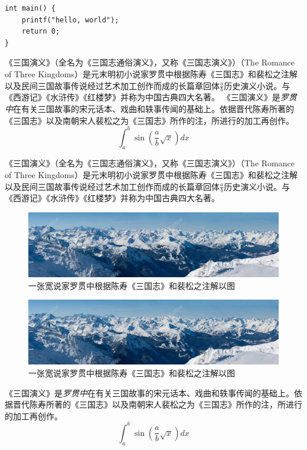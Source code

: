 \begin{verbatim}
int main() {
    printf("hello, world");
    return 0;
}
\end{verbatim}

《三国演义》（全名为《三国志通俗演义》，又称《三国志演义》）（The Romance of Three Kingdoms）是元末明初小说家罗贯中根据陈寿\cite{ausubel1991}《三国志》和裴松之注解以及民间三国故事传说经过艺术加工创作而成的长篇章回体$\frac{a}{b}$历史演义小说。与《西游记》《水浒传》《红楼梦》并称为中国古典四大名著。
《三国演义》是\emph{罗贯中}在有关{\sffamily 三国故事的宋元话本}、戏曲和轶事传闻的基础上。依据晋代陈寿所著的《三国志》以及南朝宋人裴松之为《三国志》所作的注，所进行的加工再创作。
\begin{equation}
    \int_a^b\sin(\frac{a}{b}\sqrt{x})dx
\end{equation}

《三国演义》（全名为《三国志通俗演义》，又称《三国志演义》）（The Romance of Three Kingdoms）是元末明初小说家罗贯中根据陈寿《三国志》和裴松之注解以及民间三国故事传说经过艺术加工创作而成的长篇章回体$\frac{a}{b}$历史演义小说。与《西游记》《水浒传》《红楼梦》并称为中国古典四大名著。
\begin{figure}
    \includegraphics[width=\linewidth]{images/wide.jpeg}
    \caption{一张宽说家罗贯中根据陈寿《三国志》和裴松之注解以图}
\end{figure}
\begin{figure}
    \includegraphics[width=\linewidth]{images/wide.jpeg}
    \caption{一张宽说家罗贯中根据陈寿《三国志》和裴松之注解以图}
\end{figure}
《三国演义》是\emph{罗贯中}在有关{\sffamily 三国故事的宋元话本}、戏曲和轶事传闻的基础上。依据晋代陈寿所著的《三国志》以及南朝宋人裴松之为《三国志》所作的注，所进行的加工再创作。
\begin{equation}
    \int_a^b\sin(\frac{a}{b}\sqrt{x})dx
\end{equation}

